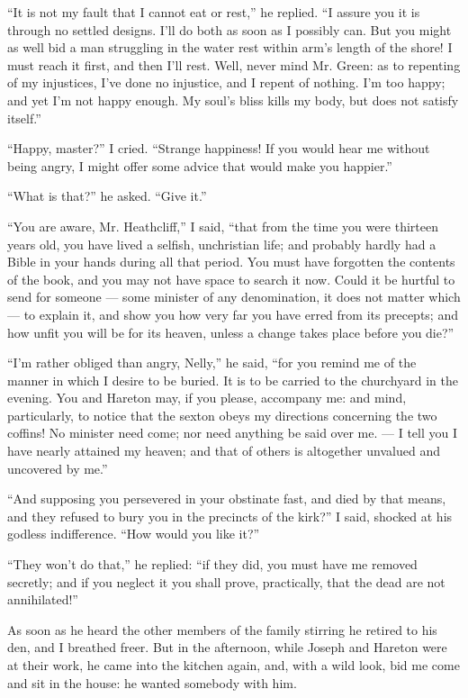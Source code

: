 \par “It is not my fault that I cannot eat or rest,” he replied. “I assure you it is through no settled designs. I'll do both as soon as I possibly can. But you might as well bid a man struggling in the water rest within arm's length of the shore! I must reach it first, and then I'll rest. Well, never mind Mr. Green: as to repenting of my injustices, I've done no injustice, and I repent of nothing. I'm too happy; and yet I'm not happy enough. My soul's bliss kills my body, but does not satisfy itself.”
\par “Happy, master?” I cried. “Strange happiness! If you would hear me without being angry, I might offer some advice that would make you happier.”
\par “What is that?” he asked. “Give it.”
\par “You are aware, Mr. Heathcliff,” I said, “that from the time you were thirteen years old, you have lived a selfish, unchristian life; and probably hardly had a Bible in your hands during all that period. You must have forgotten the contents of the book, and you may not have space to search it now. Could it be hurtful to send for someone — some minister of any denomination, it does not matter which — to explain it, and show you how very far you have erred from its precepts; and how unfit you will be for its heaven, unless a change takes place before you die?”
\par “I'm rather obliged than angry, Nelly,” he said, “for you remind me of the manner in which I desire to be buried. It is to be carried to the churchyard in the evening. You and Hareton may, if you please, accompany me: and mind, particularly, to notice that the sexton obeys my directions concerning the two coffins! No minister need come; nor need anything be said over me. — I tell you I have nearly attained my heaven; and that of others is altogether unvalued and uncovered by me.”
\par “And supposing you persevered in your obstinate fast, and died by that means, and they refused to bury you in the precincts of the kirk?” I said, shocked at his godless indifference. “How would you like it?”
\par “They won't do that,” he replied: “if they did, you must have me removed secretly; and if you neglect it you shall prove, practically, that the dead are not annihilated!”
\par As soon as he heard the other members of the family stirring he retired to his den, and I breathed freer. But in the afternoon, while Joseph and Hareton were at their work, he came into the kitchen again, and, with a wild look, bid me come and sit in the house: he wanted somebody with him.

